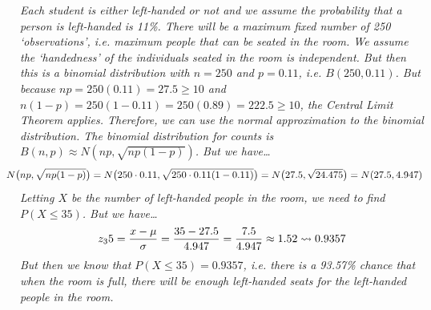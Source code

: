 \documentclass[12pt,letterpaper]{exam}
\begin{document}
\begin{questions}
{\itshape
\sol Each student is either left-handed or not and we assume the probability that a person is left-handed is 11\%. There will be a maximum fixed number of 250 `observations', i.e. maximum people that can be seated in the room. We assume the `handedness' of the individuals seated in the room is independent. But then this is a binomial distribution with $n= 250$ and $p= 0.11$, i.e. $B(250, 0.11)$. But because $np= 250 (0.11)= 27.5 \geq 10$ and $n(1 - p)= 250(1 - 0.11)= 250(0.89)= 222.5 \geq 10$, the Central Limit Theorem applies. Therefore, we can use the normal approximation to the binomial distribution. The binomial distribution for counts is $B(n, p) \approx N(np, \sqrt{np(1 - p)} )$. But we have\dots
	\[
	\hspace{-0.5cm} N\big(np, \sqrt{np(1 - p)} \big)= N\big( 250 \cdot 0.11, \sqrt{250 \cdot 0.11 (1 - 0.11)} \big)= N\big(27.5, \sqrt{24.475} \big)= N(27.5, 4.947)
	\]
Letting $X$ be the number of left-handed people in the room, we need to find $P(X \leq 35)$. But we have\dots
	\[
	z_35= \dfrac{x - \mu}{\sigma}= \dfrac{35 - 27.5}{4.947}= \dfrac{7.5}{4.947} \approx 1.52 \rightsquigarrow 0.9357
	\]
But then we know that $P(X \leq 35)= 0.9357$, i.e. there is a 93.57\% chance that when the room is full, there will be enough left-handed seats for the left-handed people in the room. 
}


\end{questions}
\end{document}
